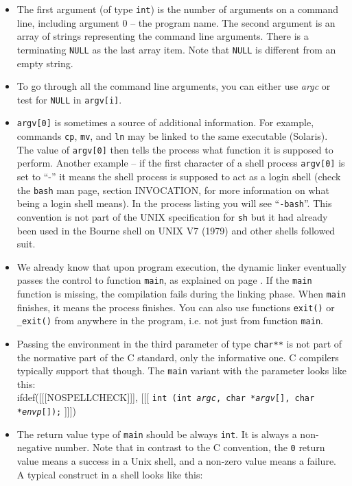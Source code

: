 \begin{itemize}
\item The first argument (of type \texttt{int}) is the number of arguments on a
command line, including argument 0 -- the program name.  The second argument is
an array of strings representing the command line arguments.  There is a
terminating \texttt{NULL} as the last array item.  Note that \texttt{NULL} is
different from an empty string.
\item To go through all the command line arguments, you can either use
\emph{argc} or test for \texttt{NULL} in \texttt{argv[i]}.
\item {} \texttt{argv[0]} is sometimes a source of additional
information.  For example, commands \texttt{cp}, \texttt{mv}, and \texttt{ln} may
be linked to the same executable (Solaris).  The value of \texttt{argv[0]} then
tells the process what function it is supposed to perform.  Another example -- if
the first character of a shell process \texttt{argv[0]} is set to ``-'' it means
the shell process is supposed to act as a login shell (check the \texttt{bash}
man page, section INVOCATION, for more information on what being a login shell
means).  In the process listing you will see ``\texttt{-bash}''.  This
convention is not part of the UNIX specification for \texttt{sh} but it had already
been used in the Bourne shell on UNIX V7 (1979) and other shells followed suit.
\item We already know that upon program execution, the dynamic linker
eventually passes the control to function \texttt{main}, as explained on page
\pageref{RUNTIMELINKER}.  If the \texttt{main} function is missing, the
compilation fails during the linking phase.  When \texttt{main} finishes, it
means the process finishes.  You can also use functions \texttt{exit()} or
\verb#_exit()# from anywhere in the program, i.e. not just from function
\texttt{main}.
\item Passing the environment in the third parameter of type
\texttt{char**} is not part of the normative part of the C standard, only the
informative one.  C compilers typically support that though.
The \texttt{main} variant with the  parameter looks like this:\\
ifdef([[[NOSPELLCHECK]]], [[[
\texttt{int (int \emph{argc}, char *\emph{argv}[],
char *\emph{envp}[]);}
]]])
\item The return value type of \texttt{main} should be always \texttt{int}.
  It is always a
non-negative number.  Note that in contrast to the C convention, the \texttt{0}
return value means a success in a Unix shell, and a non-zero value means a
failure.  A typical construct in a shell looks like this:


\end{itemize}

